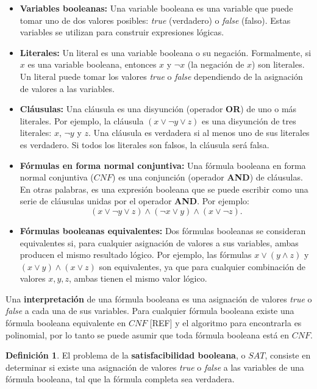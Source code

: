 \documentclass{report}
\theoremstyle{definition}
\newtheorem{definicion}{Definición}[chapter]
\theoremstyle{plain}
\theoremstyle{remark}
\begin{document}
\begin{itemize}
  \item \textbf{Variables booleanas:} Una variable booleana es una
    variable que puede tomar uno de dos valores posibles: \textit{true}
    (verdadero) o \textit{false} (falso). Estas variables se utilizan
    para construir expresiones lógicas.
  \item \textbf{Literales:} Un literal es una variable booleana o su
    negación. Formalmente, si $x$ es una variable booleana, entonces $x$
    y $\neg x$ (la negación de $x$) son literales. Un literal puede
    tomar los valores \textit{true} o \textit{false} dependiendo de la
    asignación de valores a las variables.
  \item \textbf{Cláusulas:} Una cláusula es una disyunción (operador
    \textbf{OR}) de uno o más literales. Por ejemplo, la cláusula
    $(x \vee \neg y \vee z)$ es una disyunción de tres literales: $x$,
    $\neg y$ y $z$. Una cláusula es verdadera si al menos uno de sus
    literales es verdadero. Si todos los literales son falsos, la
    cláusula será falsa.
  \item \textbf{Fórmulas en forma normal conjuntiva:} Una fórmula
    booleana en forma normal conjuntiva ($CNF$) es una conjunción
    (operador \textbf{AND}) de cláusulas. En otras palabras, es una
    expresión booleana que se puede escribir como una serie de
    cláusulas unidas por el operador \textbf{AND}. Por ejemplo:
    \[
      (x \vee \neg y \vee z) \wedge (\neg x \vee y) \wedge (x \vee \neg z).
    \]
  \item \textbf{Fórmulas booleanas equivalentes:} Dos fórmulas booleanas
    se consideran equivalentes si, para cualquier asignación de valores
    a sus variables, ambas producen el mismo resultado lógico. Por
    ejemplo, las fórmulas $x \vee (y \wedge z)$ y
    $(x \vee y) \wedge (x \vee z)$ son equivalentes, ya que para
    cualquier combinación de valores $x, y, z$, ambas tienen el mismo
    valor lógico.
\end{itemize}

Una \textbf{interpretación} de una fórmula booleana es una asignación de
valores \textit{true} o \textit{false} a cada una de sus variables. Para
cualquier fórmula booleana existe una fórmula booleana equivalente en
$CNF$ [REF] y el algoritmo para encontrarla es polinomial, por
lo tanto se puede asumir que toda fórmula booleana está en $CNF$.

\begin{definicion}
El problema de la \textbf{satisfacibilidad booleana}, o $SAT$, consiste
en determinar si existe una asignación de valores \textit{true} o
\textit{false} a las variables de una fórmula booleana, tal que la
fórmula completa sea verdadera.
\end{definicion}
\end{document}

